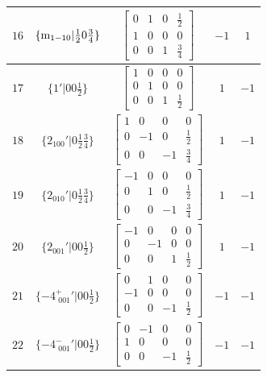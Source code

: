 \documentclass[fleqn,8pt]{jsarticle}
\begin{document}
\begin{longtable}{ccccc}
$ 16 $ & $ \{{\rm m}_{1-10}|\frac{1}{2} 0 \frac{3}{4}\} $ & $ \begin{bmatrix} 0 & 1 & 0 & \frac{1}{2} \\ 1 & 0 & 0 & 0 \\ 0 & 0 & 1 & \frac{3}{4} \end{bmatrix} $ & $ -1 $ & $ 1 $ \\ \hline
$ 17 $ & $ \{1{}'|0 0 \frac{1}{2}\} $ & $ \begin{bmatrix} 1 & 0 & 0 & 0 \\ 0 & 1 & 0 & 0 \\ 0 & 0 & 1 & \frac{1}{2} \end{bmatrix} $ & $ 1 $ & $ -1 $ \\ \hline
$ 18 $ & $ \{2{}_{100}{}'|0 \frac{1}{2} \frac{3}{4}\} $ & $ \begin{bmatrix} 1 & 0 & 0 & 0 \\ 0 & -1 & 0 & \frac{1}{2} \\ 0 & 0 & -1 & \frac{3}{4} \end{bmatrix} $ & $ 1 $ & $ -1 $ \\ \hline
$ 19 $ & $ \{2{}_{010}{}'|0 \frac{1}{2} \frac{3}{4}\} $ & $ \begin{bmatrix} -1 & 0 & 0 & 0 \\ 0 & 1 & 0 & \frac{1}{2} \\ 0 & 0 & -1 & \frac{3}{4} \end{bmatrix} $ & $ 1 $ & $ -1 $ \\ \hline
$ 20 $ & $ \{2{}_{001}{}'|0 0 \frac{1}{2}\} $ & $ \begin{bmatrix} -1 & 0 & 0 & 0 \\ 0 & -1 & 0 & 0 \\ 0 & 0 & 1 & \frac{1}{2} \end{bmatrix} $ & $ 1 $ & $ -1 $ \\ \hline
$ 21 $ & $ \{-4^{+}_{\,\,001}{}'|0 0 \frac{1}{2}\} $ & $ \begin{bmatrix} 0 & 1 & 0 & 0 \\ -1 & 0 & 0 & 0 \\ 0 & 0 & -1 & \frac{1}{2} \end{bmatrix} $ & $ -1 $ & $ -1 $ \\ \hline
$ 22 $ & $ \{-4^{-}_{\,\,001}{}'|0 0 \frac{1}{2}\} $ & $ \begin{bmatrix} 0 & -1 & 0 & 0 \\ 1 & 0 & 0 & 0 \\ 0 & 0 & -1 & \frac{1}{2} \end{bmatrix} $ & $ -1 $ & $ -1 $ \\ \hline

\end{longtable}
\end{document}

